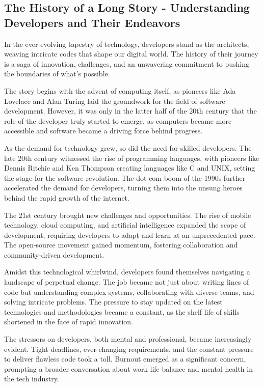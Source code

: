 \documentclass[
    a4paper, %
    10pt, %
    unnumberedsections, %
    twoside, %
]{LTJournalArticle}
\begin{document}





\subsection{The History of a Long Story - Understanding Developers and Their Endeavors}

In the ever-evolving tapestry of technology, developers stand as the architects, weaving intricate codes that shape our digital world. The history of their journey is a saga of innovation, challenges, and an unwavering commitment to pushing the boundaries of what's possible.

The story begins with the advent of computing itself, as pioneers like Ada Lovelace and Alan Turing laid the groundwork for the field of software development. However, it was only in the latter half of the 20th century that the role of the developer truly started to emerge, as computers became more accessible and software became a driving force behind progress.

As the demand for technology grew, so did the need for skilled developers. The late 20th century witnessed the rise of programming languages, with pioneers like Dennis Ritchie and Ken Thompson creating languages like C and UNIX, setting the stage for the software revolution. The dot-com boom of the 1990s further accelerated the demand for developers, turning them into the unsung heroes behind the rapid growth of the internet.

The 21st century brought new challenges and opportunities. The rise of mobile technology, cloud computing, and artificial intelligence expanded the scope of development, requiring developers to adapt and learn at an unprecedented pace. The open-source movement gained momentum, fostering collaboration and community-driven development.

Amidst this technological whirlwind, developers found themselves navigating a landscape of perpetual change. The job became not just about writing lines of code but understanding complex systems, collaborating with diverse teams, and solving intricate problems. The pressure to stay updated on the latest technologies and methodologies became a constant, as the shelf life of skills shortened in the face of rapid innovation.

The stressors on developers, both mental and professional, became increasingly evident. Tight deadlines, ever-changing requirements, and the constant pressure to deliver flawless code took a toll. Burnout emerged as a significant concern, prompting a broader conversation about work-life balance and mental health in the tech industry.
\end{document}
